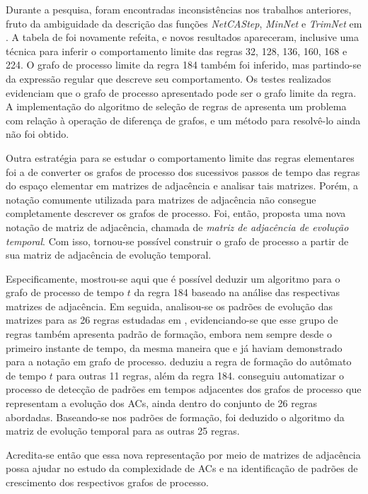\documentclass[12pt,a4paper]{article}
\begin{document}
Durante a pesquisa, foram encontradas inconsistências nos trabalhos anteriores,
fruto da ambiguidade da descrição das funções \emph{NetCAStep}, \emph{MinNet} e \emph{TrimNet}
em . A tabela de  foi novamente
refeita, e novos resultados apareceram, inclusive uma técnica para inferir
o comportamento limite das regras 32, 128, 136, 160, 168 e 224. O grafo de processo
limite da regra 184 também foi inferido, mas partindo-se da expressão regular
que descreve seu comportamento. Os testes realizados evidenciam que o grafo
de processo apresentado pode ser o grafo limite da regra. A implementação do
algoritmo de seleção de regras de  apresenta um
problema com relação à operação de diferença de grafos, e um método para
resolvê-lo ainda não foi obtido.

Outra estratégia para se estudar o comportamento limite das regras elementares
foi a de converter os grafos de processo dos sucessivos
passos de tempo das regras do espaço elementar em matrizes de adjacência e analisar
tais matrizes. Porém, a notação comumente utilizada para matrizes de adjacência
não consegue completamente descrever os grafos de processo. Foi, então, proposta uma
nova notação de matriz de adjacência, chamada de \textit{matriz de
adjacência de evolução temporal}. Com isso, tornou-se possível construir o
grafo de processo a partir de sua matriz de adjacência de evolução temporal.

Especificamente, mostrou-se aqui que é possível deduzir um algoritmo para o
grafo de processo de tempo $t$ da regra 184 baseado na análise das respectivas
matrizes de adjacência. Em seguida, analisou-se
os padrões de evolução das matrizes para as 26 regras estudadas em
, evidenciando-se que esse grupo de regras
também apresenta padrão de formação, embora nem sempre desde o primeiro
instante de tempo, da mesma maneira que  e
 já haviam demonstrado para a notação em grafo de processo.
 deduziu a regra de formação do autômato de
tempo $t$ para outras 11 regras, além da regra 184. 
conseguiu automatizar o processo de detecção de padrões em tempos adjacentes
dos grafos de processo que representam a evolução dos ACs, ainda dentro do
conjunto de 26 regras abordadas. Baseando-se nos padrões de formação, foi
deduzido o algoritmo da matriz de evolução temporal para as outras 25 regras.

Acredita-se então que essa nova representação por meio de matrizes de
adjacência possa ajudar no estudo da complexidade de ACs e na identificação
de padrões de crescimento dos respectivos grafos de processo.
\end{document}
